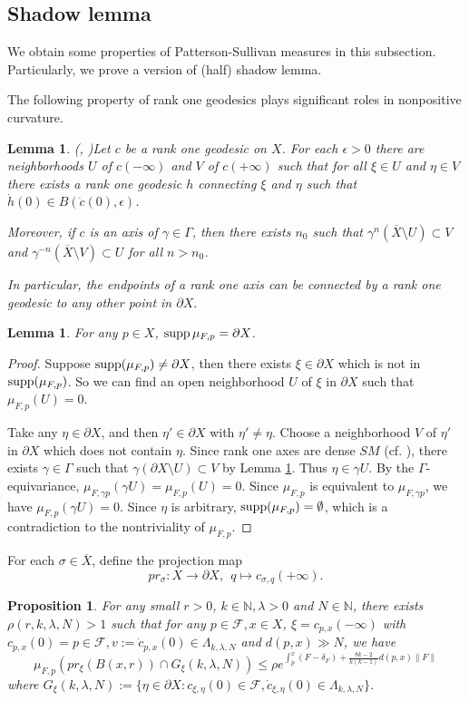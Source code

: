 \documentclass[11pt]{amsart}
\newtheorem{lemma}[theorem]{Lemma}
\newtheorem{proposition}[theorem]{Proposition}
\theoremstyle{definition}
\newcommand{\F}{\mathcal{F}}
\def\pX{{\partial X}}
\def\NN{{\mathbb N}}
\def\supp{\mathop{\hbox{{\rm supp}}}}
\def\supp{\mathop{\hbox{{\rm supp}}}}
\def\c{\gamma}   \def\C{\Gamma}
\def\d{\delta}   %
\def\l{\lambda}   \def\L{\Lambda}
\begin{document}
\subsection{Shadow lemma}
We obtain some properties of Patterson-Sullivan measures in this subsection. Particularly, we prove a version of (half) shadow lemma.

The following property of rank one geodesics plays significant roles in nonpositive curvature.
\begin{lemma}(\cite[Lemma 2.1]{Kn}, \cite[Lemma 3.1]{BB})\label{key}
Let $c$ be a rank one geodesic on $X$. For each $\epsilon > 0$ there are neighborhoods $U$ of $c(-\infty)$ and $V$ of $c(+\infty)$ such that for all $\xi\in U$ and $\eta\in V$ there exists a rank one geodesic $h$ connecting $\xi$ and $\eta$ such that $\dot h(0)\in B(\dot c(0),\epsilon)$.

Moreover, if $c$ is an axis of $\gamma\in \Gamma$, then there exists $n_0$ such that
$\gamma^n(\overline X\setminus U)\subset V$ and $\gamma^{-n}(\overline X\setminus V)\subset U$
for all $n>n_0$.

In particular, the endpoints of a rank one axis can be connected by a rank one geodesic to any other point in $\pX.$
\end{lemma}
\begin{lemma}\label{supp}
For any $p\in X$, $\supp \mu_{F,p}= \pX$.
\end{lemma}

\begin{proof}
Suppose $\supp(\mu_{F,p})\neq \pX$, then there exists $\xi \in \pX$ which is not in $\supp(\mu_{F, p})$. So we can find an open neighborhood $U$ of $\xi$ in $\pX$ such that $\mu_{F, p}(U)=0$.

Take any $\eta\in \pX$, and then $\eta'\in \pX$ with $\eta'\neq\eta$. Choose a neighborhood $V$ of $\eta'$ in $\pX$ which does not contain $\eta$. Since rank one axes are dense $SM$ (cf. \cite{Bal0}), there exists $\c\in \Gamma$ such that $\c(\pX\setminus U)\subset V$ by Lemma \ref{key}. Thus $\eta\in \c U$.
By the $\Gamma$-equivariance, $\mu_{F, \c p}(\c U)=\mu_{F, p}(U)=0$. Since $\mu_{F, p}$ is equivalent to $\mu_{F, \c p}$, we have $\mu_{F, p}(\c U)=0$. Since $\eta$ is arbitrary, $\supp(\mu_{F, p}) = \emptyset$, which is a contradiction to the nontriviality of $\mu_{F,p}$.
\end{proof}

For each $\sigma \in \overline X$, define the projection map
$$pr_{\sigma}: X \rightarrow \pX, ~~q \mapsto c_{\sigma,q}(+\infty).$$
\begin{proposition}\label{alph}
For any small $r>0$, $k\in \NN, \l>0$ and $N\in \NN$, there exists $\rho(r, k, \lambda, N)>1$ such that for any $p\in \F, x\in X$, $\xi=c_{p,x}(-\infty)$ with $c_{p,x}(0)=p\in \F, v:=\dot c_{p,x}(0)\in \L_{k,\l, N}$ and $d(p,x)\gg N$, we have
\begin{equation}\label{e:alph}
\mu_{F,p}(pr_{\xi}(B(x,r))\cap G_\xi(k, \l, N))\le \rho e^{\int_p^x(F-\d_F)+\frac{8k-2}{k(k-1)}d(p,x)\|F\|}
\end{equation}
where $G_\xi(k, \l, N):=\{\eta\in \pX: c_{\xi,\eta}(0)\in \F, \dot{c}_{\xi,\eta}(0)\in \L_{k,\l, N}\}$.
\end{proposition}
\end{document}
